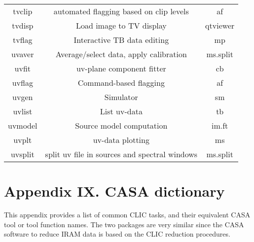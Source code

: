 \begin{table}[h!]
\begin{center}
\begin{tabular}{|c|c|c|}
  tvclip  &  automated flagging based on clip levels  &  af  \\
  tvdisp  &  Load image to TV display      &  qtviewer  \\
  tvflag  &  Interactive TB data editing   &  mp   \\
  uvaver  &  Average/select data, apply calibration  &  ms.split  \\
  uvfit   &  uv-plane component fitter     &  cb  \\
  uvflag  &  Command-based flagging        &  af  \\
  uvgen   &  Simulator                     &  sm  \\
  uvlist  &  List uv-data                  &  tb  \\
  uvmodel &  Source model computation      &  im.ft  \\
  uvplt   &  uv-data plotting              &   ms  \\
  uvsplit &  split uv file in sources and spectral windows &  ms.split  \\
\hline
\end{tabular}
\end{center}
\end{table}

\chapter{Appendix IX. CASA dictionary}
\label{chapter:app.9}

This appendix provides a list of common CLIC tasks, and their
equivalent CASA tool or tool function names. The two packages are
very similar since the CASA software to reduce IRAM data is based
on the CLIC reduction procedures.

